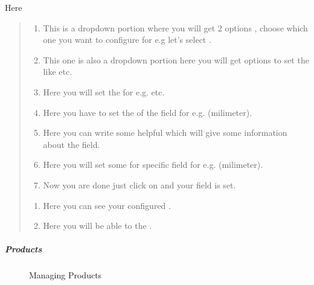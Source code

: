 \documentclass[a4paper,10pt,english]{report}
\begin{document}
Here
\begin{quote}
\begin{enumerate}
\def\theenumi{\alph{enumi}}
\def\labelenumi{\theenumi .}
\makeatletter\def\p@enumii{\p@enumi \theenumi .}\makeatother
\item {} 
This is a dropdown portion where you will get 2 options  , choose which one you want to configure for e.g let’s select .

\item {} 
This one is also a dropdown portion here you will get options to set the  like  etc.

\item {} 
Here you will set the  for e.g.  etc.

\item {} 
Here you have to set the  of the field for e.g.  (milimeter).

\item {} 
Here you can write some helpful  which will give some information about the field.

\item {} 
Here you will set some  for specific field for e.g.  (milimeter).

\item {} 
Now you are done just click on  and your field is set.

\end{enumerate}
\begin{enumerate}
\def\theenumi{\arabic{enumi}}
\def\labelenumi{\theenumi .}
\makeatletter\def\p@enumii{\p@enumi \theenumi .}\makeatother
\setcounter{enumi}{1}
\item {} 
Here you can see your configured  .

\item {} 
Here you will be able to  the  .

\end{enumerate}
\end{quote}


\subparagraph{Products}
\label{\detokenize{configure:products}}
\begin{figure}[htbp]
\centering
\capstart

\noindent{}
\caption{Managing Products}\label{\detokenize{configure:id10}}\label{\detokenize{configure:id2}}\end{figure}
\end{document}
